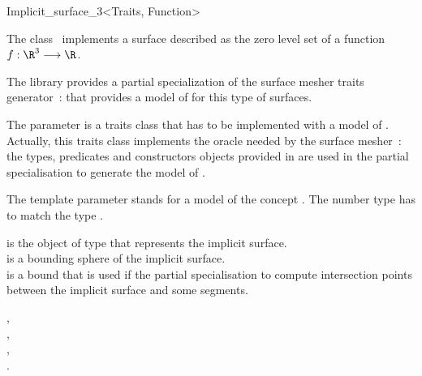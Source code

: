 

\begin{ccRefClass}{Implicit_surface_3<Traits, Function>}


\ccDefinition
  
The class \ccRefName\  implements a surface described 
as the zero level
set  of a function \begin{math}f : \R^3 \longrightarrow \R\end{math}.


The library provides a partial specialization
of the  surface mesher traits generator~:
that provides a model of  for this type of surfaces.


The parameter  is a traits class 
that has to be implemented with a model of 
.
Actually, this traits class implements the oracle needed by the
surface mesher~:
the types, predicates and constructors objects provided
in  are
used in 
the partial specialisation 
to generate the model of  .

The template parameter   stands for a model
of the concept .
The number type  has to match
the type .


\ccCreation
{}

{ is the object of type  that represents the implicit
  surface.\\
  is a bounding sphere of the implicit surface.\\
  is a bound that is used if the partial specialisation 
 to compute intersection points between the implicit surface and some
 segments.}

\ccSeeAlso
{},\\
,\\
, \\
.

\end{ccRefClass}


